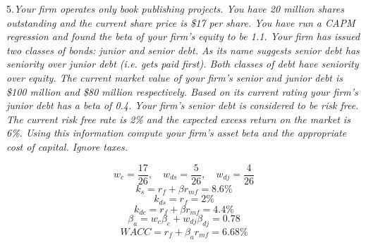 \documentclass[10pt, a4paper]{article}
\begin{document}
5.\emph{Your firm operates only book publishing projects. You have 20 million shares outstanding and the current share price is \$17 per share. You have run a CAPM regression and found the beta of your firm's equity to be 1.1. Your firm has issued two classes of bonds: junior and senior debt. As its name suggests senior debt has seniority over junior debt (i.e. gets paid first). Both classes of debt have seniority over equity. The current market value of your firm's senior and junior debt is \$100 million and \$80 million respectively. Based on its current rating your firm's junior debt has a beta of 0.4. Your firm’s senior debt is considered to be risk free. The current risk free rate is 2\% and the expected excess return on the market is 6\%. Using this information compute your firm's asset beta and the appropriate cost of capital. Ignore taxes.}

$$w_c = \frac{17}{26},\quad w_{ds} = \frac{5}{26},\quad w_{dj} = \frac{4}{26}$$
$$k_s = r_f + \beta r_{mf} = 8.6\% $$
$$k_{ds} = r_f = 2\%$$
$$k_{dc} = r_f + \beta r_{mf} = 4.4\%$$
$$\beta_a = w_c\beta_e + w_{dj}\beta_{dj} = 0.78$$
$$WACC = r_f + \beta_a r_{mf} = 6.68\%$$
\end{document}
